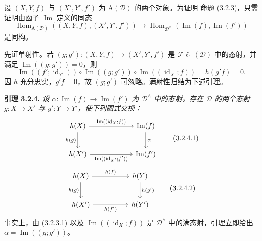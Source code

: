 \clearpage
{}%
\begingroup\small
\setlength{\parskip}{0pt}\setlength{\emergencystretch}{1.5em}

设 $(X,Y,f)$ 与 $(X',Y',f')$ 为 $\mathrm A(\mathcal D)$ 的两个对象。为证明
命题 (3.2.3)，只需证明由函子 $\operatorname{Im}$ 定义的同态
\[
\operatorname{Hom}_{\mathrm A(\mathcal D)}((X,Y,f),(X',Y',f'))
\longrightarrow
\operatorname{Hom}_{\mathcal D^\wedge}(\operatorname{Im}(f),\operatorname{Im}(f'))
\tag{3.2.3.2}
\]
是同构。

先证单射性。若 $(g;g')\colon(X,Y,f)\to(X',Y',f')$ 是
$\mathcal{F}\ell_1(\mathcal D)$ 中的态射，并满足
$\operatorname{Im}((g;g'))=0$，则
\[
\operatorname{Im}((f';\operatorname{id}_{Y'}))\circ
\operatorname{Im}((g;g'))\circ
\operatorname{Im}((\operatorname{id}_X;f))=h(g'f)=0.
\]
因 $h$ 充分忠实，$g'f=0$，故 $(g;g')$ 可忽略。满射性归结为下述引理。

\medskip\noindent\textbf{引理 3.2.4.}\quad
\textit{设 $\alpha\colon\operatorname{Im}(f)\to\operatorname{Im}(f')$ 为
$\mathcal D^\wedge$ 中的态射。存在 $\mathcal D$ 的两个态射 $g\colon X\to X'$ 与
$g'\colon Y\to Y'$，使下列图式交换：}
\[
\begin{tikzcd}[column sep=6em,row sep=2.3em]
h(X)\arrow[r,"\operatorname{Im}((\operatorname{id}_X;f))"]\arrow[d,"h(g)"']&
\operatorname{Im}(f)\arrow[d,"\alpha"]\\
h(X')\arrow[r,"\operatorname{Im}((\operatorname{id}_{X'};f'))"']&\operatorname{Im}(f')
\end{tikzcd}\tag{3.2.4.1}
\]
\[
\begin{tikzcd}[column sep=5em,row sep=2.3em]
h(X)\arrow[r,"h(f)"]\arrow[d,"h(g)"']&h(Y)\arrow[d,"h(g')"]\\
h(X')\arrow[r,"h(f')"']&h(Y')
\end{tikzcd}\tag{3.2.4.2}
\]
事实上，由 (3.2.3.1) 以及
$\operatorname{Im}((\operatorname{id}_X;f))$ 是 $\mathcal D^\wedge$ 中的满态射，引理立即给出
$\alpha=\operatorname{Im}((g;g'))$。
\endgroup
